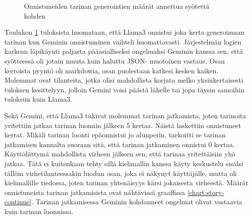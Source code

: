 \begin{figure}[H]
    \centering
    \caption{Onnistuneiden tarinan generointien määrät annettua syötettä kohden}
    \label{chart:story-start}
\end{figure}

Taulukon \ref{chart:story-start} tuloksista huomataan, että Llama3 onnistui
joka kerta generoimaan tarinan kun Geminin onnistuminen vaihteli huomattavasti.
Järjestelmän logien karkean läpikäynti paljasta pääasialliseksi ongelmaksi
Geminin kanssa sen, että syötteessä oli jotain muuta kuin haluttu JSON-
muotoinen vastaus. Osan kerroista pyyntö oli markdowia, osan puolestaan katkesi
kesken kaiken. Molemmat ovat tilanteita, jotka olisi mahdollista korjata melko
yksinkertaisesti tuloksen kesittelyyn, jolloin Gemini voisi päästä lähelle tai
jopa täysin samoihin tuloksiin kuin Llama3.

Sekä Gemini, että Llama3 tukivat molemmat tarinan jatkamista, joten tarinoita
yritettiin jatkaa tarinan luonnin jälkeen 5 kertaa. Näistä laskettiin
onnistuneet kerrat. Mikäli tarinan luonti epäonnistui jo alunperin, tarkoitti
se tarinan jatkamisen kannalta suoraan sitä, että tarinan jatkaminen onnistui
0 kertaa. Käyttöliittymä mahdollista virheen jälkeen sen, että tarinaa
yritettäisiin yhä jatkaa. Tätä ei kuitenkaan tehty sillä kielimallin kanssa
käyty keskustelu sisälsi tällöin virhetilanteessakin luodun osan, joka ei
näkynyt käyttäjälle, mutta oli kielimallille tiedossa, joten tarinan
yhtenäisyys kärsi jokaisesta virheestä. Määrät onnistuneista tarinan
jatkamisista ovat nähtävissä graaffissa \ref{chart:story-continue}. Tarinan
jatkamisessa Geminin kohdanneet ongelmat olivat vastaavia kuin tarinan
luonnissa.

